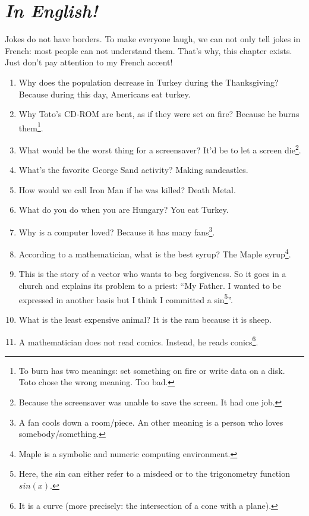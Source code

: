 \documentclass[10pt,a5paper,fullpage]{book}
\begin{document}
	\chapter{\textit{In English!}}
	Jokes do not have borders. To make everyone laugh, we can not only tell jokes in French: most people can not understand them. That's why, this chapter exists. 
	\\Just don't pay attention to my French accent!
	\newpage
	\begin{enumerate}
		\item Why does the population decrease in Turkey during the Thanksgiving? Because during this day, Americans eat turkey.
		\item Why Toto’s CD-ROM are bent, as if they were set on fire? Because he burns them\footnote{To burn has two meanings: set something on fire or write data on a disk. Toto chose the wrong meaning. Too bad.}. 
		\item What would be the worst thing for a screensaver? It’d be to let a screen die\footnote{Because the screensaver was unable to save the screen. It had one job.}. 
		\item What's the favorite George Sand activity? Making sandcastles.
		\item How would we call Iron Man if he was killed? Death Metal. 
		\item What do you do when you are Hungary? You eat Turkey.
		\item Why is a computer loved? Because it has many fans\footnote{A fan cools down a room/piece. An other meaning is a person who loves somebody/something.}.
		\item According to a mathematician, what is the best syrup? The Maple syrup\footnote{Maple is a symbolic and numeric computing environment.}.
		\item This is the story of a vector who wants to beg forgiveness. So it goes in a church and explains its problem to a priest: “My Father. I wanted to be expressed in another basis but I think I committed a sin\footnote{Here, the sin can either refer to a misdeed or to the trigonometry function $sin(x)$.}”.
		\item What is the least expensive animal? It is the ram because it is sheep.
		\item A mathematician does not read comics. Instead, he reads conics\footnote{It is a curve (more precisely: the intersection of a cone with a plane).}.

\end{enumerate}
\end{document}
